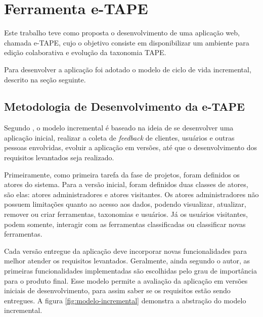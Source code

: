 \chapter[Ferramenta]{Ferramenta e-TAPE}
\label{cap:cap3}
Este trabalho teve como proposta o desenvolvimento de uma aplicação web, chamada e-TAPE, cujo o objetivo consiste em
disponibilizar um ambiente para edição colaborativa e evolução da taxonomia TAPE.

\par
Para desenvolver a aplicação foi adotado o modelo de ciclo de vida incremental, descrito na seção seguinte.

\section {Metodologia de Desenvolvimento da e-TAPE}
\label{sec:desenvolvimento}
\par
Segundo , o modelo incremental é baseado na ideia de se desenvolver uma aplicação inicial,
realizar a coleta de \textit{feedback} de clientes, usuários e outras pessoas envolvidas, evoluir a aplicação em versões, até que o desenvolvimento dos requisitos 
levantados seja realizado.

\par
Primeiramente, como primeira tarefa da fase de projetos, foram definidos os atores do sistema. Para a versão inicial, foram definidos duas classes de atores, são elas: 
atores administradores e atores visitantes. Os atores administradores não possuem limitações quanto ao acesso aos dados, podendo visualizar, atualizar, remover ou criar ferramentas,
taxonomias e usuários. Já os usuários visitantes, podem somente, interagir com as ferramentas classificadas ou classificar novas ferramentas. 

\par
Cada versão entregue da aplicação deve incorporar novas funcionalidades para melhor atender os requisitos levantados. Geralmente, ainda segundo o autor, as primeiras funcionalidades
implementadas são escolhidas pelo grau de importância para o produto final. Esse modelo permite a avaliação da aplicação em versões iniciais de desenvolvimento, para assim saber 
se os requisitos estão sendo entregues. A figura \ref{fig:modelo-incremental} demonstra a abstração do modelo incremental.


